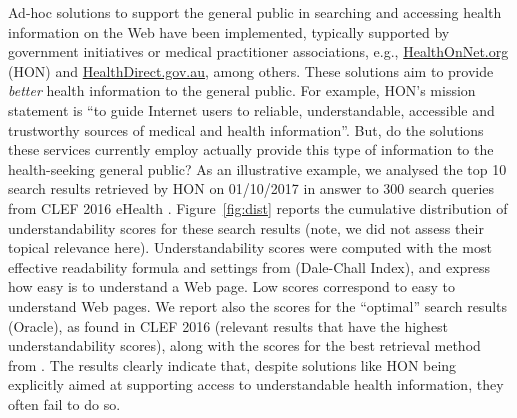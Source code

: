 Ad-hoc solutions to support the general public in searching and accessing health information on the Web have been implemented, typically supported by government initiatives or medical practitioner associations, e.g., \url{HealthOnNet.org} (HON) and \url{HealthDirect.gov.au}, among others. These solutions aim to provide \textit{better} health information to the general public. For example, HON's mission statement is ``to guide Internet users to reliable, understandable, accessible and trustworthy sources of medical and health information''. But, do the solutions these services currently employ actually provide this type of information to the health-seeking general public? As an illustrative example, we analysed the top 10 search results retrieved by HON on 01/10/2017 in answer to 300 search queries from CLEF 2016 eHealth . Figure~\ref{fig:dist} reports the cumulative distribution of understandability scores for these search results (note, we did not assess their topical relevance here). Understandability scores were computed with the most effective readability formula and settings from  (Dale-Chall Index), and express how easy is to understand a Web page. Low scores correspond to easy to understand Web pages. We report also the scores for the ``optimal'' search results (Oracle), as found in CLEF 2016 (relevant results that have the highest understandability scores), along with the scores for the best retrieval method from . The results clearly indicate that, despite solutions like HON being explicitly aimed at supporting access to understandable health information, they often fail to do so.


